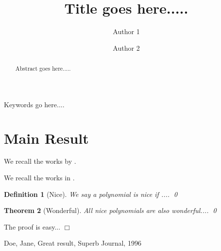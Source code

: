 \documentclass[final,1p,times,authoryear]{elsarticle}
\newtheorem{theorem}{Theorem}
\newtheorem{definition}[theorem]{Definition}
\newenvironment{proof}{\noindent{\em Proof:}}{$\Box$~\\}
\begin{document}
\begin{frontmatter}

\title{Title goes here.....}

\author{Author 1}
\address{Address 1}

\author{Author 2}
\address{Address 2}

\begin{abstract}
Abstract goes here.....
\end{abstract}

\begin{keyword}
Keywords go here.... 
\end{keyword}
\end{frontmatter}



\section{Main Result}

We recall the works by \cite{Key1}.

We recall the works in \citep{Key1}.

\begin{definition}[Nice]
We say a polynomial is \emph{nice} if ....  \qed
\end{definition}

\begin{theorem}[Wonderful]
All nice polynomials are also wonderful....  \qed
\end{theorem}

\begin{proof}
The proof is easy... 
\end{proof}


\begin{thebibliography}{30}
Doe, Jane, Great result, Superb Journal, 1996
\end{thebibliography}
\end{document}
